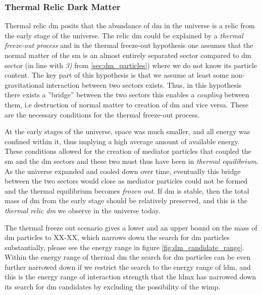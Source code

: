 \subsubsection{Thermal Relic Dark Matter}
\label{sec:termal_relic}


Thermal relic \gls{dm} posits that the abundance of \gls{dm} in the universe is a relic from the early stage of the universe. The relic \gls{dm} could be explained by a \textit{thermal freeze-out process} and in the thermal freeze-out hypothesis one assumes that the normal matter of the \gls{sm} is an almost entirely separated sector compared to \gls{dm} sector (in line with \textit{3)} from \ref{sec:dm_particles}) where we do not know its particle content. The key part of this hypothesis is that we assume at least some non-gravitational interaction between two sectors exists. Thus, in this hypothesis there exists a ''bridge'' between the two sectors this enables a \textit{coupling} between them, i.e destruction of normal matter to creation of \gls{dm} and vice versa. These are the necessary conditions for the thermal freeze-out process. 

At the early stages of the universe, space was much smaller, and all energy was confined within it, thus implying a high average amount of available energy. These conditions allowed for the creation of mediator particles that coupled the \gls{sm} and the \gls{dm} sectors and these two must thus have been in \textit{thermal equilibrium}. As the universe expanded and cooled down over time, eventually this bridge between the two sectors would close as mediator particles could not be formed and the thermal equilibrium becomes \textit{frozen out}. If \gls{dm} is stable, then the total mass of \gls{dm} from the early stage should be relatively preserved, and this is the \textit{thermal relic \gls{dm}} we observe in the universe today. \cite{du2022-revisiting-freeze-in-freeze-out} 



The thermal freeze out scenario gives a lower and an upper bound on the mass of \gls{dm} particles to XX-XX, which narrows down the search for \gls{dm} particles substantially, please see the energy range in figure \ref{fig:dm_candidate_range}. Within the energy range of thermal \gls{dm} the search for \gls{dm} particles can be even further narrowed down if we restrict the search to the energy range of \gls{ldm}, and this is the energy range of interaction strength that the \gls{ldmx} has narrowed down its search for \gls{dm} candidates by excluding the possibility of the \gls{wimp}. 

